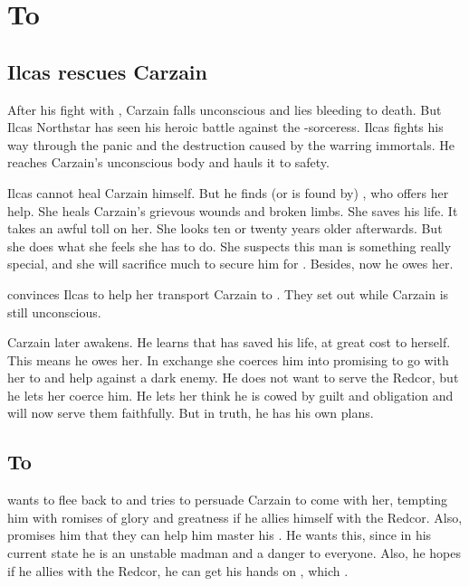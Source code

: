 \chapter{To \Redce}





\section{Ilcas rescues Carzain}
After his fight with \Takestsha, Carzain falls unconscious and lies bleeding to death. 
But Ilcas Northstar has seen his heroic battle against the \dragon-sorceress. 
Ilcas fights his way through the panic and the destruction caused by the warring immortals. 
He reaches Carzain's unconscious body and hauls it to safety. 

Ilcas cannot heal Carzain himself. 
But he finds (or is found by) \Esmerel, who offers her help.
She heals Carzain's grievous wounds and broken limbs. 
She saves his life. 
It takes an awful toll on her.
She looks ten or twenty years older afterwards. 
But she does what she feels she has to do.
She suspects this man is something really special, and she will sacrifice much to secure him for \ClanRedcor.
Besides, now he owes her. 

\Esmerel convinces Ilcas to help her transport Carzain to \Redce. 
They set out while Carzain is still unconscious. 

Carzain later awakens.
He learns that \Esmerel has saved his life, at great cost to herself. 
This means he owes her.
In exchange she coerces him into promising to go with her to \Redce and help \ClanRedcor against a dark enemy. 
He does not want to serve the Redcor, but he lets her coerce him.
He lets her think he is cowed by guilt and obligation and will now serve them faithfully. 
But in truth, he has his own plans. 




\section{To \Redce}
\Esmerel{} wants to flee back to \Redce{} and tries to persuade Carzain to come with her, tempting him with romises of glory and greatness if he allies himself with the Redcor. 
Also, \Esmerel{} promises him that they can help him master his . 
He wants this, since in his current state he is an unstable madman and a danger to everyone. 
Also, he hopes if he allies with the Redcor, he can get his hands on , which . 

